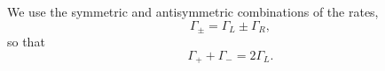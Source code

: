 \documentclass{article}
\begin{document}
We use the symmetric and antisymmetric combinations of the rates,
\begin{equation}
\Gamma_\pm = \Gamma_L \pm \Gamma_R ,
\label{eq:gpm}
\end{equation}
so that
\begin{equation}
\Gamma_+ + \Gamma_- = 2\Gamma_L .
\label{eq:sum}
\end{equation}
\end{document}

